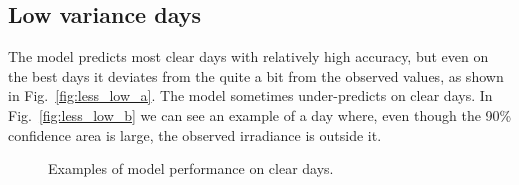 \subsection{Low variance days}
The model predicts most clear days with relatively high accuracy, but even on the best days it deviates from the quite a bit from the observed values, as shown in Fig.~\ref{fig:less_low_a}. The model sometimes under-predicts on clear days. In Fig.~\ref{fig:less_low_b} we can see an example of a day where, even though the 90\% confidence area is large, the observed irradiance is outside it.
\begin{figure}[ht!]
    \centering
    \qquad
    \qquad
    \caption{Examples of model performance on clear days.
    \label{fig:less_low}}
\end{figure}


